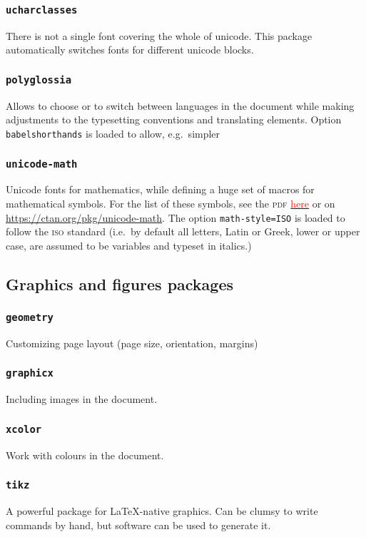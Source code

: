 \documentclass{article}
\begin{document}
\subsubsection{\texttt{ucharclasses}}
There is not a single font covering the whole of unicode. This package automatically switches fonts for different unicode blocks.
\subsubsection{\texttt{polyglossia}}
Allows to choose or to switch between languages in the document while making adjustments to the typesetting conventions and translating elements. Option \texttt{babelshorthands} is loaded to allow, e.g.\ simpler 
\subsubsection{\texttt{unicode-math}}
Unicode fonts for mathematics, while defining a huge set of macros for mathematical symbols. For the list of these symbols, see the \textsc{pdf} \href{http://mirrors.ctan.org/macros/unicodetex/latex/unicode-math/unimath-symbols.pdf}{\textcolor{red}{here}} or on \url{https://ctan.org/pkg/unicode-math}. The option \texttt{math-style=ISO} is loaded to follow the \textsc{iso} standard (i.e.\ by default all letters, Latin or Greek, lower or upper case, are assumed to be variables and typeset in italics.)



\subsection{Graphics and figures packages}
\subsubsection{\texttt{geometry}}
Customizing page layout (page size, orientation, margins)
\subsubsection{\texttt{graphicx}}
Including images  in the document.
\subsubsection{\texttt{xcolor}}
Work with colours in the document.
\subsubsection{\texttt{tikz}}
A powerful package for \LaTeX-native graphics. Can be clumsy to write commands by hand, but software can be used to generate it.
\end{document}
